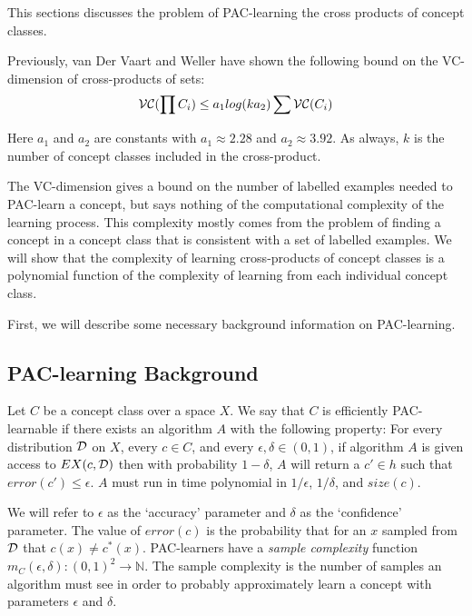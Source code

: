 This sections discusses the problem of PAC-learning the cross products of concept classes. 

Previously, van Der Vaart and Weller \cite{van2009note} have shown the following bound on the VC-dimension of cross-products of sets:
\[\mathcal{V}\mathcal{C}(\prod C_i) \le a_1 log(k a_2) \sum \mathcal{V}\mathcal{C}(C_i)\] 

Here $a_1$ and $a_2$ are constants with $a_1 \approx 2.28$ and $a_2 \approx 3.92$.
As always, $k$ is the number of concept classes included in the cross-product.

The VC-dimension gives a bound on the number of labelled examples needed to PAC-learn a concept, but says nothing of the computational complexity of the learning process. 
This complexity mostly comes from the problem of finding a concept in a concept class that is consistent with a set of labelled examples. 
We will show that the complexity of learning cross-products of concept classes is a polynomial function of the complexity of learning from each individual concept class.

First, we will describe some necessary background information on PAC-learning.

\subsection{PAC-learning Background}






\begin{definition}
Let $C$ be a concept class over a space $X$. 
We say that $C$ is efficiently PAC-learnable if there exists an algorithm $A$ with the following property:
For every distribution $\mathcal{D}$ on $X$, every $c \in C$, and every $\epsilon, \delta \in (0, 1)$,
if algorithm $A$ is given access to $EX(c,\mathcal{D})$ then with probability $1 - \delta$, $A$ will return a $c' \in h$ such that $error(c') \le \epsilon$. 
$A$ must run in time polynomial in $1/\epsilon$, $1/\delta$, and $size(c)$. 
\end{definition}

We will refer to $\epsilon$ as the `accuracy' parameter and $\delta$ as the `confidence' parameter.
The value of $error(c)$ is the probability that for an $x$ sampled from $\mathcal{D}$ that $c(x) \ne c^*(x)$. 
 PAC-learners have a \emph{sample complexity} function $m_C(\epsilon, \delta): (0,1)^2 \rightarrow \mathbb{N}$. 
The sample complexity is the number of samples an algorithm must see in order to probably approximately learn a concept with parameters $\epsilon$ and $\delta$.


